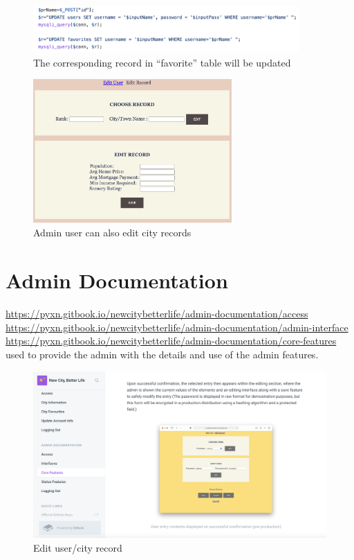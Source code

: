 \documentclass[12pt, letterpaper]{article}
\begin{document}
 \begin{figure}[htbp]
	\centering
	\includegraphics[width=4in]{images/q17-2.png}
	\caption{The corresponding record in “favorite” table will be updated}
 \end{figure}
 
 \begin{figure}[htbp]
	\centering
	\includegraphics[width=3in]{images/q17-3.png}
	\caption{Admin user can also edit city records}
 \end{figure}

 \newpage

\section{Admin Documentation}
\url{https://pyxn.gitbook.io/newcitybetterlife/admin-documentation/access}
\\\url{https://pyxn.gitbook.io/newcitybetterlife/admin-documentation/admin-interface}
\\\url{https://pyxn.gitbook.io/newcitybetterlife/admin-documentation/core-features}
\\used to provide the admin with the details and use of the admin features.

\begin{figure}[htbp]
	\centering
	\includegraphics[width=5in]{images/q18-1.png}
	\caption{Edit user/city record}
 \end{figure}
 
\end{document}
